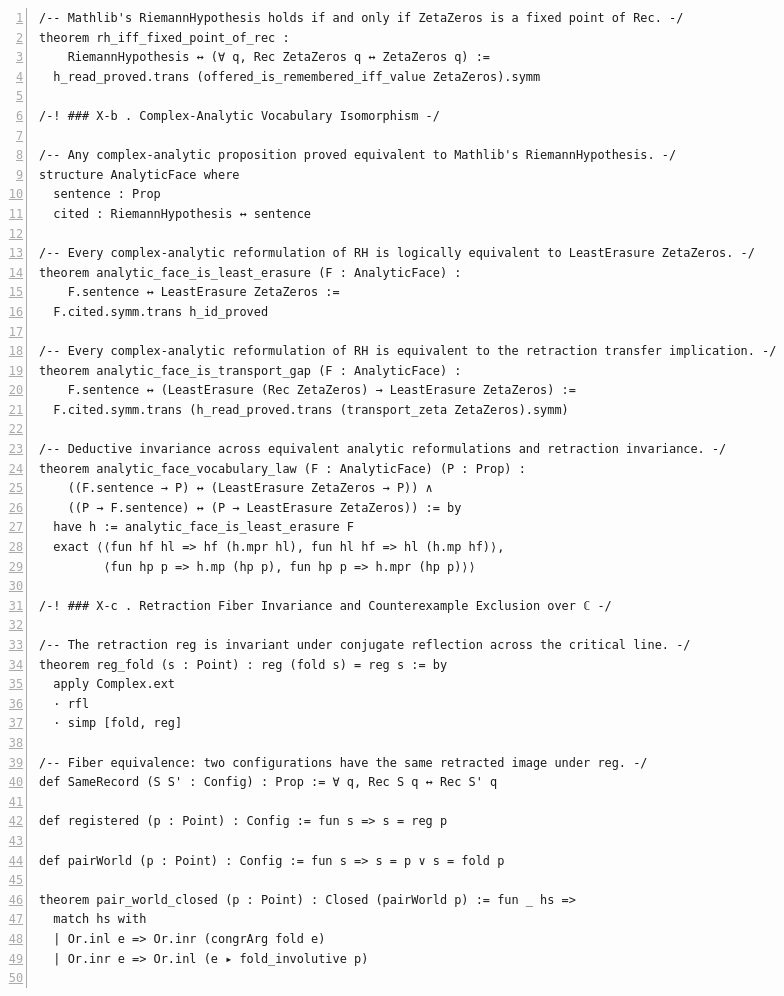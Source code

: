 \documentclass[10pt]{article}
\newcommand{\leansize}{\fontsize{5.5pt}{6.75pt}\selectfont}
\begin{document}
\begin{multicols}{2}
\begin{Verbatim}[numbers=left,firstnumber=1,numbersep=3pt,xleftmargin=2.6em,breaklines=true,breakanywhere=true,breakautoindent=false,breakindent=1.4em,breaksymbolleft={},breakanywheresymbolpre={},fontsize=\leansize]
/-- Mathlib's RiemannHypothesis holds if and only if ZetaZeros is a fixed point of Rec. -/
theorem rh_iff_fixed_point_of_rec :
    RiemannHypothesis ↔ (∀ q, Rec ZetaZeros q ↔ ZetaZeros q) :=
  h_read_proved.trans (offered_is_remembered_iff_value ZetaZeros).symm

/-! ### X-b . Complex-Analytic Vocabulary Isomorphism -/

/-- Any complex-analytic proposition proved equivalent to Mathlib's RiemannHypothesis. -/
structure AnalyticFace where
  sentence : Prop
  cited : RiemannHypothesis ↔ sentence

/-- Every complex-analytic reformulation of RH is logically equivalent to LeastErasure ZetaZeros. -/
theorem analytic_face_is_least_erasure (F : AnalyticFace) :
    F.sentence ↔ LeastErasure ZetaZeros :=
  F.cited.symm.trans h_id_proved

/-- Every complex-analytic reformulation of RH is equivalent to the retraction transfer implication. -/
theorem analytic_face_is_transport_gap (F : AnalyticFace) :
    F.sentence ↔ (LeastErasure (Rec ZetaZeros) → LeastErasure ZetaZeros) :=
  F.cited.symm.trans (h_read_proved.trans (transport_zeta ZetaZeros).symm)

/-- Deductive invariance across equivalent analytic reformulations and retraction invariance. -/
theorem analytic_face_vocabulary_law (F : AnalyticFace) (P : Prop) :
    ((F.sentence → P) ↔ (LeastErasure ZetaZeros → P)) ∧
    ((P → F.sentence) ↔ (P → LeastErasure ZetaZeros)) := by
  have h := analytic_face_is_least_erasure F
  exact ⟨⟨fun hf hl => hf (h.mpr hl), fun hl hf => hl (h.mp hf)⟩,
         ⟨fun hp p => h.mp (hp p), fun hp p => h.mpr (hp p)⟩⟩

/-! ### X-c . Retraction Fiber Invariance and Counterexample Exclusion over ℂ -/

/-- The retraction reg is invariant under conjugate reflection across the critical line. -/
theorem reg_fold (s : Point) : reg (fold s) = reg s := by
  apply Complex.ext
  · rfl
  · simp [fold, reg]

/-- Fiber equivalence: two configurations have the same retracted image under reg. -/
def SameRecord (S S' : Config) : Prop := ∀ q, Rec S q ↔ Rec S' q

def registered (p : Point) : Config := fun s => s = reg p

def pairWorld (p : Point) : Config := fun s => s = p ∨ s = fold p

theorem pair_world_closed (p : Point) : Closed (pairWorld p) := fun _ hs =>
  match hs with
  | Or.inl e => Or.inr (congrArg fold e)
  | Or.inr e => Or.inl (e ▸ fold_involutive p)


\end{Verbatim}
\end{multicols}
\end{document}
